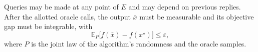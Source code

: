 \documentclass[10pt]{article}
\theoremstyle{definition}
\begin{document}
Queries may be made at any point of $E$ and may depend on previous replies. After the allotted oracle calls, the output $\bar{x}$ must be measurable and its objective gap must be integrable, with
\[
\mathbb{E}_{P}\bigl[f(\bar{x})-f(x^\star)\bigr]\leq\varepsilon,
\]
where $P$ is the joint law of the algorithm's randomness and the oracle samples.
\end{document}
